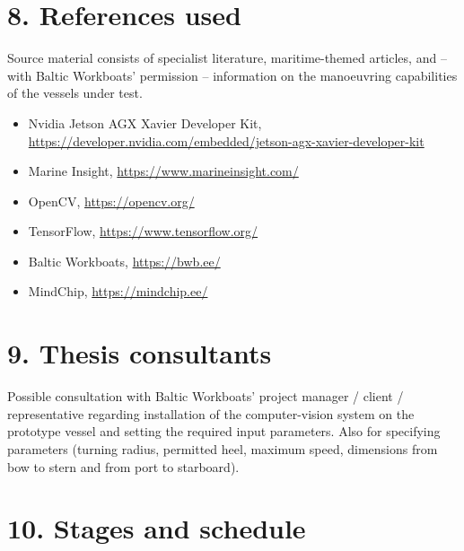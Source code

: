 \section*{8. References used}

Source material consists of specialist literature, maritime-themed articles, and -- with Baltic Workboats' permission -- information on the manoeuvring capabilities of the vessels under test.

\begin{itemize}
  \item Nvidia Jetson AGX Xavier Developer Kit, \url{https://developer.nvidia.com/embedded/jetson-agx-xavier-developer-kit}
  \item Marine Insight, \url{https://www.marineinsight.com/}
  \item OpenCV, \url{https://opencv.org/}
  \item TensorFlow, \url{https://www.tensorflow.org/}
  \item Baltic Workboats, \url{https://bwb.ee/}
  \item MindChip, \url{https://mindchip.ee/}
\end{itemize}

\section*{9. Thesis consultants}

Possible consultation with Baltic Workboats' project manager / client / representative regarding installation of the computer-vision system on the prototype vessel and setting the required input parameters. Also for specifying parameters (turning radius, permitted heel, maximum speed, dimensions from bow to stern and from port to starboard).

\section*{10. Stages and schedule}

